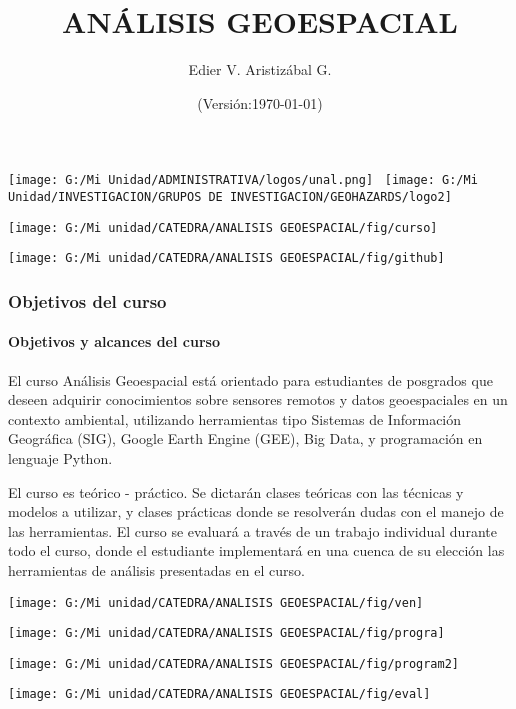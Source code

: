 \documentclass[12pt]{beamer}
\title[Introducción]{ANÁLISIS GEOESPACIAL}
\author[Edier Aristizábal]{Edier V. Aristizábal G.}
\institute{\emph{evaristizabalg@unal.edu.co}}
\date{(Versión:\today)}
\begin{document}
\begin{frame}
\titlepage
\centering
	\texttt{[image: G:/Mi Unidad/ADMINISTRATIVA/logos/unal.png]}\hspace*{4.75cm}~%
   	\texttt{[image: G:/Mi Unidad/INVESTIGACION/GRUPOS DE INVESTIGACION/GEOHAZARDS/logo2]} 
\end{frame}
\begin{frame}
\centering
	\texttt{[image: G:/Mi unidad/CATEDRA/ANALISIS GEOESPACIAL/fig/curso]}
\end{frame}
 \begin{frame}
\centering
	\texttt{[image: G:/Mi unidad/CATEDRA/ANALISIS GEOESPACIAL/fig/github]}
\end{frame}
\begin{frame}
\frametitle{Objetivos del curso}
\framesubtitle{Objetivos y alcances del curso}
El curso \alert{Análisis Geoespacial} está orientado para estudiantes de posgrados que deseen adquirir conocimientos sobre sensores remotos y datos geoespaciales en un contexto ambiental, utilizando herramientas tipo Sistemas de Información Geográfica (SIG), Google Earth Engine (GEE), Big Data, y programación en lenguaje Python.\vfill

El curso es teórico - práctico. Se dictarán clases teóricas con las técnicas y modelos a utilizar, y clases prácticas donde se resolverán dudas con el manejo de las herramientas. El curso se evaluará a través de un trabajo individual durante todo el curso, donde el estudiante implementará en una cuenca de su elección las herramientas de análisis presentadas en el curso.
\end{frame}
\begin{frame}
\centering
	\texttt{[image: G:/Mi unidad/CATEDRA/ANALISIS GEOESPACIAL/fig/ven]}
\end{frame}
\begin{frame}
\centering
	\texttt{[image: G:/Mi unidad/CATEDRA/ANALISIS GEOESPACIAL/fig/progra]}
\end{frame}
\begin{frame}
\centering
	\texttt{[image: G:/Mi unidad/CATEDRA/ANALISIS GEOESPACIAL/fig/program2]}
\end{frame}
\begin{frame}
\centering
	\texttt{[image: G:/Mi unidad/CATEDRA/ANALISIS GEOESPACIAL/fig/eval]}
\end{frame}
\end{document}
